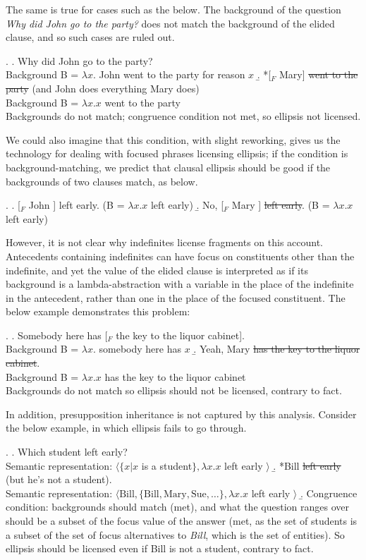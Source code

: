 \documentclass[doublespace]{umthesis}
\newcommand{\pred}[1]{\ensuremath{\mathrm{{#1}}}}
\begin{document}
The same is true for cases such as the below. The background of the question {\it Why did John go to the party?} does not match the background of the elided clause, and so such cases are ruled out.

\ex. 	\a. Why did John go to the party?\\
		Background B = $\lambda x. $ John went to the party for reason $x$
	\b. *[$_{F}$ Mary] \sout{went to the party} (and John does everything Mary does)\\
		Background B = $\lambda x. x$ went to the party\\
		Backgrounds do not match; congruence condition not met, so ellipsis not licensed.

We could also imagine that this condition, with slight reworking, gives us the technology for dealing with focused phrases licensing ellipsis; if the condition is background-matching, we predict that clausal ellipsis should be good if the backgrounds of two clauses match, as below.


\ex. 	\a. [$_{F}$ John ] left early. (B = $\lambda x. x$ left early)
	\b. No, [$_{F}$ Mary ] \sout{left early}. (B = $\lambda x. x$ left early)

However, it is not clear why indefinites license fragments on this account. Antecedents containing indefinites can have focus on constituents other than the indefinite, and yet the value of the elided clause is interpreted as if its background is a lambda-abstraction with a variable in the place of the indefinite in the antecedent, rather than one in the place of the focused constituent. The below example demonstrates this problem:

\ex. 	\a. Somebody here has [$_{F}$ the key to the liquor cabinet].\\
		Background B = $\lambda x. $ somebody here has $x$
	\b. Yeah, Mary \sout{has the key to the liquor cabinet}.\\
		Background B = $\lambda x. x$ has the key to the liquor cabinet\\
		Backgrounds do not match so ellipsis should not be licensed, contrary to fact.
		
In addition, presupposition inheritance is not captured by this analysis.
Consider the below example, in which ellipsis fails to go through.

\ex. 	\a. Which student left early?\\
		Semantic representation: $\langle \{ x | x$ is a student$\}, \lambda x. x $ left early $\rangle$
	\b. *Bill \sout{left early} (but he's not a student).\\
		Semantic representation: $\langle \pred{Bill}, \{\pred{Bill, Mary, Sue, \ldots}\}, \lambda x. x $ left early $\rangle$
	\b. Congruence condition: backgrounds should match (met), and what the question ranges over should be a subset of the focus value of the answer (met, as the set of students is a subset of the set of focus alternatives to {\it Bill}, which is the set of entities). So ellipsis should be licensed even if Bill is not a student, contrary to fact.
	
\end{document}
